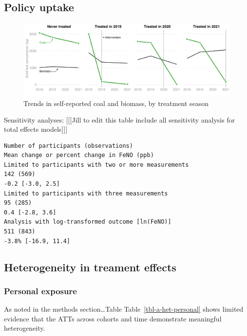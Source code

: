 \documentclass[
  letterpaper,
  DIV=11,
  numbers=noendperiod]{scrartcl}
\begin{document}
\hypertarget{policy-uptake-1}{%
\subsection{Policy uptake}\label{policy-uptake-1}}

\begin{figure}[H]

{\centering \includegraphics[width=1\textwidth,height=\textheight]{images/coal-plot.png}

}

\caption{\label{fig-afig-coal}Trends in self-reported coal and biomass,
by treatment season}

\end{figure}

Sensitivity analyses: {[}{[}{[}Jill to edit this table include all
sensitivity analysis for total effects models{]}{]}{]}

\begin{verbatim}
Number of participants (observations)
Mean change or percent change in FeNO (ppb)
Limited to participants with two or more measurements
142 (569)
-0.2 [-3.0, 2.5]
Limited to participants with three measurements
95 (285)
0.4 [-2.8, 3.6]
Analysis with log-transformed outcome [ln(FeNO)]
511 (843)
-3.8% [-16.9, 11.4]
\end{verbatim}

\hypertarget{heterogeneity-in-treament-effects}{%
\subsection{Heterogeneity in treament
effects}\label{heterogeneity-in-treament-effects}}

\hypertarget{personal-exposure}{%
\subsubsection{Personal exposure}\label{personal-exposure}}

As noted in the methods section\ldots Table
Table~\ref{tbl-a-het-personal} shows limited evidence that the ATTs
across cohorts and time demonstrate meaningful heterogeneity.
\end{document}
